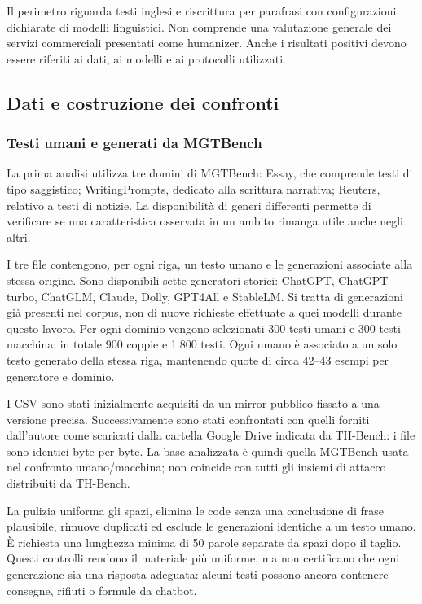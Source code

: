 \documentclass[11pt,a4paper]{article}
\begin{document}
Il perimetro riguarda testi inglesi e riscrittura per parafrasi con configurazioni dichiarate di modelli linguistici. Non comprende una valutazione generale dei servizi commerciali presentati come humanizer. Anche i risultati positivi devono essere riferiti ai dati, ai modelli e ai protocolli utilizzati.

\subsection{Dati e costruzione dei confronti}\label{dati-e-costruzione-dei-confronti}

\subsubsection{Testi umani e generati da MGTBench}\label{testi-umani-e-generati-da-mgtbench}

La prima analisi utilizza tre domini di MGTBench: Essay, che comprende testi di tipo saggistico; WritingPrompts, dedicato alla scrittura narrativa; Reuters, relativo a testi di notizie. La disponibilità di generi differenti permette di verificare se una caratteristica osservata in un ambito rimanga utile anche negli altri.

I tre file contengono, per ogni riga, un testo umano e le generazioni associate alla stessa origine. Sono disponibili sette generatori storici: ChatGPT, ChatGPT-turbo, ChatGLM, Claude, Dolly, GPT4All e StableLM. Si tratta di generazioni già presenti nel corpus, non di nuove richieste effettuate a quei modelli durante questo lavoro. Per ogni dominio vengono selezionati 300 testi umani e 300 testi macchina: in totale 900 coppie e 1.800 testi. Ogni umano è associato a un solo testo generato della stessa riga, mantenendo quote di circa 42--43 esempi per generatore e dominio.

I CSV sono stati inizialmente acquisiti da un mirror pubblico fissato a una versione precisa. Successivamente sono stati confrontati con quelli forniti dall'autore come scaricati dalla cartella Google Drive indicata da TH-Bench: i file sono identici byte per byte. La base analizzata è quindi quella MGTBench usata nel confronto umano/macchina; non coincide con tutti gli insiemi di attacco distribuiti da TH-Bench.

La pulizia uniforma gli spazi, elimina le code senza una conclusione di frase plausibile, rimuove duplicati ed esclude le generazioni identiche a un testo umano. È richiesta una lunghezza minima di 50 parole separate da spazi dopo il taglio. Questi controlli rendono il materiale più uniforme, ma non certificano che ogni generazione sia una risposta adeguata: alcuni testi possono ancora contenere consegne, rifiuti o formule da chatbot.
\end{document}
